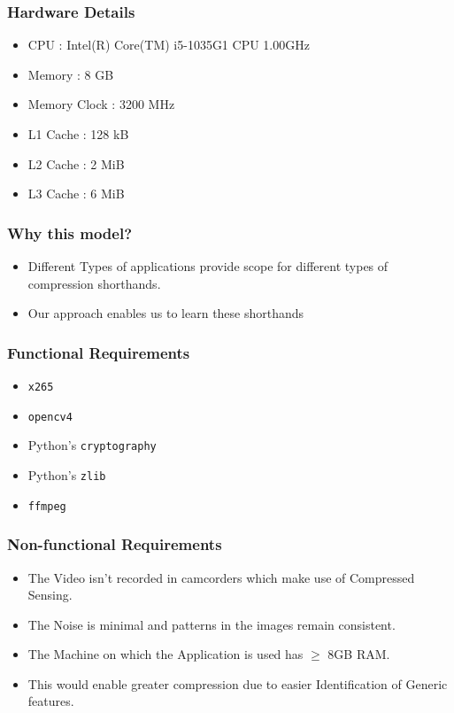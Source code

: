 \documentclass{beamer}
\begin{document}
\begin{frame}
    \frametitle{Hardware Details}
    \begin{itemize}
        \item CPU : Intel(R) Core(TM) i5-1035G1 CPU \@ 1.00GHz

        \item Memory : 8 GB
        \item Memory Clock : 3200 MHz
        \item L1 Cache : 128 kB
        \item L2 Cache : 2 MiB
        \item L3 Cache : 6 MiB
    \end{itemize}
\end{frame}

\begin{frame}
    \frametitle{Why this model?}
    \begin{itemize}
        \item Different Types of applications provide scope for different types of compression shorthands.
        \pause
        \item Our approach enables us to learn these shorthands
    \end{itemize}
\end{frame}

\begin{frame}
    \frametitle{Functional Requirements}
    \begin{itemize}
        \item \texttt{x265}
        \item \texttt{opencv4}
        \item Python's \texttt{cryptography}
        \item Python's \texttt{zlib}
        \item \texttt{ffmpeg}
    \end{itemize}
\end{frame}


\begin{frame}
    \frametitle{Non-functional Requirements}

    \begin{itemize}
        \item The Video isn't recorded in camcorders which make use of Compressed Sensing.
        \item The Noise is minimal and patterns in the images remain consistent.
        \item The Machine on which the Application is used has $\geq$ 8GB RAM.
        \item This would enable greater compression due to easier Identification of Generic features.
    \end{itemize}
\end{frame}
\end{document}
